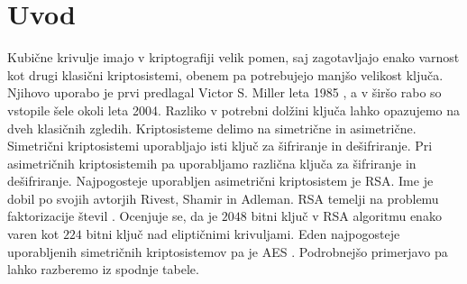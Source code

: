 \documentclass[12pt,a4paper,twoside]{article}
\theoremstyle{definition} %
\theoremstyle{plain} %
\numberwithin{equation}{section}  %
\begin{document}
\section{Uvod}
Kubične krivulje imajo v kriptografiji velik pomen, saj zagotavljajo enako varnost kot drugi klasični kriptosistemi, obenem pa potrebujejo manjšo velikost ključa. Njihovo uporabo je prvi predlagal Victor S. Miller leta 1985 \cite{Miller}, a v širšo rabo so vstopile šele okoli leta 2004. Razliko v potrebni dolžini ključa lahko opazujemo na dveh klasičnih zgledih. Kriptosisteme delimo na simetrične in asimetrične. Simetrični kriptosistemi uporabljajo isti ključ za šifriranje in dešifriranje. Pri asimetričnih kriptosistemih pa uporabljamo različna ključa za šifriranje in dešifriranje. Najpogosteje uporabljen asimetrični kriptosistem je RSA. Ime je dobil po svojih avtorjih Rivest, Shamir in Adleman. RSA temelji na problemu faktorizacije števil \cite{Easttom2015}. Ocenjuje se, da je $2048$ bitni ključ v RSA algoritmu enako varen kot $224$ bitni ključ nad eliptičnimi krivuljami.
Eden najpogosteje uporabljenih simetričnih kriptosistemov pa je AES \cite{Easttom2015}. Podrobnejšo primerjavo pa lahko razberemo iz spodnje tabele.
\end{document}
